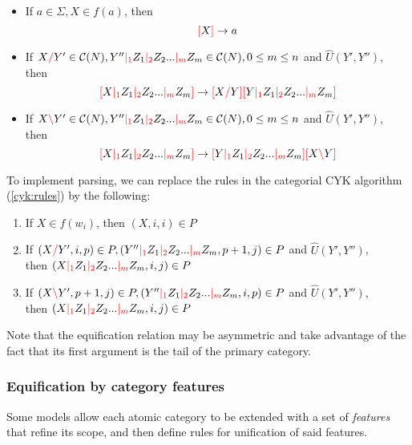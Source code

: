 \documentclass[main.tex]{subfiles}
\begin{document}
\begin{itemize}
    \item If $ a \in \Sigma, X \in f(a) $, then \[ \textcolor{red}{[} X \textcolor{red}{]} \rightarrow a \]
    \item If $ X \textcolor{red}{/} Y' \in \mathcal{C}( N ), Y'' \textcolor{red}{|_{1}} Z_1 \textcolor{red}{|_{2}} Z_2 ... \textcolor{red}{|_{m}} Z_m \in \mathcal{C}( N ), 0 \leq m \leq n $
        and $\hat{U}(Y', Y'')$, \\
        then \[ \textcolor{red}{[} X \textcolor{red}{|_{1}} Z_1 \textcolor{red}{|_{2}} Z_2 ... \textcolor{red}{|_{m}} Z_m \textcolor{red}{]} \rightarrow \textcolor{red}{[} X \textcolor{red}{/} Y \textcolor{red}{]} \textcolor{red}{[} Y \textcolor{red}{|_{1}} Z_1 \textcolor{red}{|_{2}} Z_2 ... \textcolor{red}{|_{m}} Z_m \textcolor{red}{]} \]
    \item If $ X \textcolor{red}{\backslash} Y' \in \mathcal{C}( N ), Y'' \textcolor{red}{|_{1}} Z_1 \textcolor{red}{|_{2}} Z_2 ... \textcolor{red}{|_{m}} Z_m \in \mathcal{C}( N ), 0 \leq m \leq n $
        and $\hat{U}(Y', Y'')$, \\
        then \[ \textcolor{red}{[} X \textcolor{red}{|_{1}} Z_1 \textcolor{red}{|_{2}} Z_2 ... \textcolor{red}{|_{m}} Z_m \textcolor{red}{]} \rightarrow \textcolor{red}{[} Y \textcolor{red}{|_{1}} Z_1 \textcolor{red}{|_{2}} Z_2 ... \textcolor{red}{|_{m}} Z_m \textcolor{red}{]} \textcolor{red}{[} X \textcolor{red}{\backslash} Y \textcolor{red}{]} \]
\end{itemize}

To implement parsing, we can replace the rules in the categorial CYK algorithm
(\cref{cyk:rules}) by the following:

\begin{enumerate}
    \item If $X \in f(w_i)$, then $(X, i, i) \in P$
    \item If $(X \textcolor{red}{/} Y', i, p) \in P, (Y'' \textcolor{red}{|_{1}} Z_1 \textcolor{red}{|_{2}} Z_2 ... \textcolor{red}{|_{m}} Z_m, p + 1, j) \in P$
        and $\hat{U}(Y', Y'')$, \\
        then $(X \textcolor{red}{|_{1}} Z_1 \textcolor{red}{|_{2}} Z_2 ... \textcolor{red}{|_{m}} Z_m, i, j) \in P$
    \item If $(X \textcolor{red}{\backslash} Y', p + 1, j) \in P, (Y'' \textcolor{red}{|_{1}} Z_1 \textcolor{red}{|_{2}} Z_2 ... \textcolor{red}{|_{m}} Z_m, i, p) \in P$
        and $\hat{U}(Y', Y'')$, \\
        then $(X \textcolor{red}{|_{1}} Z_1 \textcolor{red}{|_{2}} Z_2 ... \textcolor{red}{|_{m}} Z_m, i, j) \in P$
\end{enumerate}

Note that the equification relation may be asymmetric and take advantage of the fact
that its first argument is the tail of the primary category.

\subsubsection{Equification by category features}
Some models allow each atomic category to be extended with a set of \emph{features}
that refine its scope, and then define rules for unification of said features.
\end{document}
